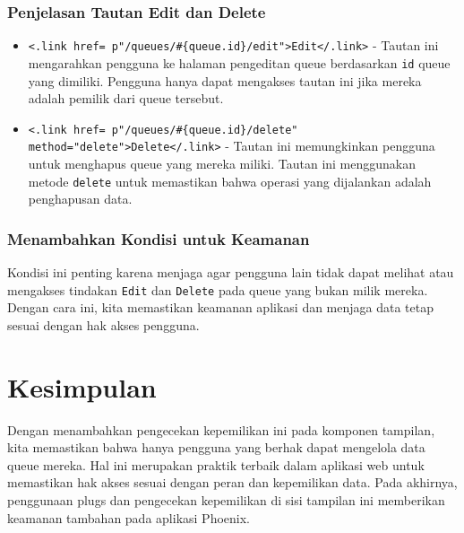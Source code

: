 \subsubsection{Penjelasan Tautan Edit dan Delete}
\begin{itemize}
	\item \texttt{<.link href={~p"/queues/\#\{queue.id\}/edit"}>Edit</.link>} - Tautan ini mengarahkan pengguna ke halaman pengeditan queue berdasarkan \texttt{id} queue yang dimiliki. Pengguna hanya dapat mengakses tautan ini jika mereka adalah pemilik dari queue tersebut.
	\item \texttt{<.link href={~p"/queues/\#\{queue.id\}/delete"} method="delete">Delete</.link>} - Tautan ini memungkinkan pengguna untuk menghapus queue yang mereka miliki. Tautan ini menggunakan metode \texttt{delete} untuk memastikan bahwa operasi yang dijalankan adalah penghapusan data.
\end{itemize}

\subsubsection{Menambahkan Kondisi untuk Keamanan}
Kondisi ini penting karena menjaga agar pengguna lain tidak dapat melihat atau mengakses tindakan \texttt{Edit} dan \texttt{Delete} pada queue yang bukan milik mereka. Dengan cara ini, kita memastikan keamanan aplikasi dan menjaga data tetap sesuai dengan hak akses pengguna.

\section{Kesimpulan}
Dengan menambahkan pengecekan kepemilikan ini pada komponen tampilan, kita memastikan bahwa hanya pengguna yang berhak dapat mengelola data queue mereka. Hal ini merupakan praktik terbaik dalam aplikasi web untuk memastikan hak akses sesuai dengan peran dan kepemilikan data. Pada akhirnya, penggunaan plugs dan pengecekan kepemilikan di sisi tampilan ini memberikan keamanan tambahan pada aplikasi Phoenix.
